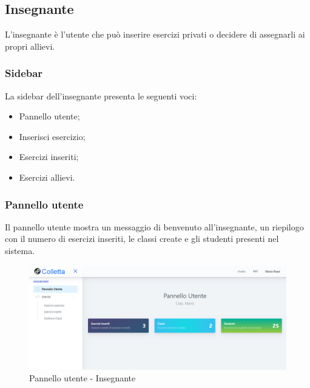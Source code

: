         
\newpage
    \subsection{Insegnante}
      L'insegnante è l'utente che può inserire esercizi privati o decidere di assegnarli ai propri allievi. 
        \subsubsection{Sidebar}
          La sidebar dell'insegnante presenta le seguenti voci:
        	\begin{itemize}
            	\item Pannello utente;
            	\item Inserisci esercizio;
            	\item Esercizi inseriti;
            	\item Esercizi allievi.
        	\end{itemize}
        
        
        
        \subsubsection{Pannello utente}
          Il pannello utente mostra un messaggio di benvenuto all'insegnante, un riepilogo con il numero di esercizi inseriti, le classi create e gli studenti presenti nel sistema.
        
        \begin{figure}[H]
            	\centering
        		\includegraphics[width=17cm]{sez/img/insegnante/pannello.png} 
            	\caption{Pannello utente - Insegnante}\label{fig:1}
        	\end{figure}
        	

